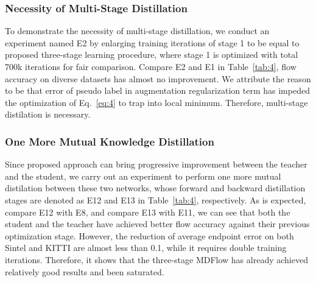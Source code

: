 \documentclass[lettersize,journal]{IEEEtran}
\begin{document}
\subsubsection{Necessity of Multi-Stage Distillation}
To demonstrate the necessity of multi-stage distillation, we conduct an experiment named E2 by enlarging training iterations of stage 1 to be equal to proposed three-stage learning procedure, where stage 1 is optimized with total 700k iterations for fair comparison. Compare E2 and E1 in Table~\ref{tab:4}, flow accuracy on diverse datasets has almost no improvement. We attribute the reason to be that error of pseudo label in augmentation regularization term has impeded the optimization of Eq.~\ref{eq:4} to trap into local minimum. Therefore, multi-stage distilation is necessary.

\subsubsection{One More Mutual Knowledge Distillation}
Since proposed approach can bring progressive improvement between the teacher and the student, we carry out an experiment to perform one more mutual distilation between these two networks, whose forward and backward distillation stages are denoted as E12 and E13 in Table~\ref{tab:4}, respectively. As is expected, compare E12 with E8, and compare E13 with E11, we can see that both the student and the teacher have achieved better flow accuracy against their previous optimization stage. However, the reduction of average endpoint error on both Sintel and KITTI are almost less than 0.1, while it requires double training iterations. Therefore, it shows that the three-stage MDFlow has already achieved relatively good results and been saturated.
\end{document}
